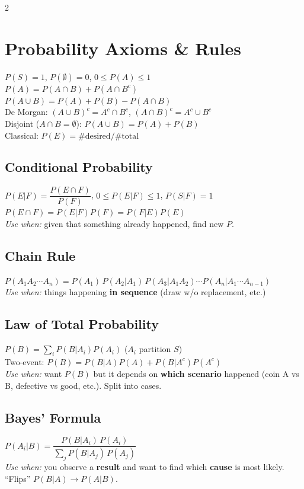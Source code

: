 \documentclass[10pt]{article}
\begin{document}
\begin{multicols*}{2}

\section{Probability Axioms \& Rules}
$P(S)=1$, $P(\emptyset)=0$, $0 \le P(A) \le 1$ \\
$P(A) = P(A \cap B) + P(A \cap B^c)$ \\
$P(A \cup B) = P(A) + P(B) - P(A \cap B)$ \\
De Morgan: $(A \cup B)^c = A^c \cap B^c$,\; $(A \cap B)^c = A^c \cup B^c$ \\
Disjoint ($A \cap B = \emptyset$): $P(A \cup B) = P(A) + P(B)$ \\
Classical: $P(E) = \text{\# desired} / \text{\# total}$

\subsection{Conditional Probability}
$P(E|F) = \dfrac{P(E \cap F)}{P(F)}$, \quad $0 \le P(E|F) \le 1$, \quad $P(S|F) = 1$ \\[1pt]
$P(E \cap F) = P(E|F)P(F) = P(F|E)P(E)$ \\
\textit{Use when:} given that something already happened, find new $P$.

\subsection{Chain Rule}
$P(A_1 A_2 \cdots A_n) = P(A_1)\,P(A_2|A_1)\,P(A_3|A_1 A_2) \cdots P(A_n|A_1 \cdots A_{n-1})$ \\
\textit{Use when:} things happening \textbf{in sequence} (draw w/o replacement, etc.)

\subsection{Law of Total Probability}
$P(B) = \sum_i P(B|A_i)P(A_i)$ \quad ($A_i$ partition $S$) \\
Two-event: $P(B) = P(B|A)P(A) + P(B|A^c)P(A^c)$ \\
\textit{Use when:} want $P(B)$ but it depends on \textbf{which scenario} happened (coin A vs B, defective vs good, etc.). Split into cases.

\subsection{Bayes' Formula}
$P(A_i|B) = \dfrac{P(B|A_i)\,P(A_i)}{\sum_j P(B|A_j)\,P(A_j)}$ \\[1pt]
\textit{Use when:} you observe a \textbf{result} and want to find which \textbf{cause} is most likely. ``Flips'' $P(B|A) \to P(A|B)$.


\end{multicols*}
\end{document}
